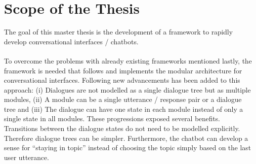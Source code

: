 \section{Scope of the Thesis}
The goal of this master thesis is the development of a framework to rapidly develop conversational interfaces / chatbots.
\\~\\
To overcome the problems with already existing frameworks mentioned lastly, the framework is needed that follows and implements the modular architecture for conversational interfaces. Following new advancements has been added to this approach: (i) Dialogues are not modelled as a single dialogue tree but as multiple modules, (ii) A module can be a single utterance / response pair or a dialogue tree and (iii) The dialogue can have one state in each module instead of only a single state in all modules. These progressions exposed several benefits. Transitions between the dialogue states do not need to be modelled explicitly. Therefore dialogue trees can be simpler. Furthermore, the chatbot can develop a sense for “staying in topic” instead of choosing the topic simply based on the last user utterance.

